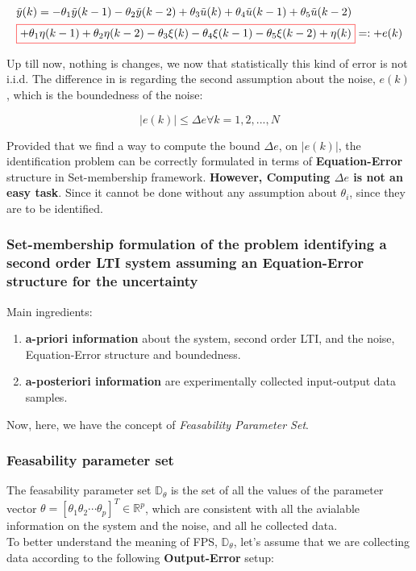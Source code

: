 \[
\begin{array}{l}
\tilde{y}(k)= -\theta_1 \tilde{y}(k - 1) - \theta_2 \tilde{y}(k - 2) + \theta_3 \tilde{u}(k) + \theta_4 \tilde{u}(k - 1) + \theta_5 \tilde{u}(k - 2) \\[1ex]
\textcolor{red}{\fbox{\textcolor{black}{$+ \theta_1\eta(k-1) + \theta_2\eta(k-2) - \theta_3\xi(k) - \theta_4\xi(k-1) - \theta_5\xi(k-2) + \eta(k) $}}} =: + e(k) \\
\end{array}
\]

Up till now, nothing is changes, we now that statistically this kind of error is not i.i.d. The difference in is regarding the second assumption about the noise, \(e(k)\), which is the boundedness of the noise:

\[\left| e(k)\right| \leq \Delta e \forall k = 1, 2, ..., N\]

Provided that we find a way to compute the bound \(\Delta e \), on \(\left| e(k)\right|\), the identification problem can be correctly formulated in terms of \textbf{Equation-Error} structure in Set-membership framework. \textbf{However, Computing \(\Delta e \) is not an easy task}. Since it cannot be done without any assumption about \(\theta_i\), since they are to be identified.

\subsubsection{Set-membership formulation of the problem identifying a second order LTI system assuming an Equation-Error structure for the uncertainty}
Main ingredients:
\begin{enumerate}
\item \textbf{a-priori information }about the system, second order LTI, and the noise, Equation-Error structure and boundedness.
\item\textbf{ a-posteriori information} are experimentally collected input-output data samples.
\end{enumerate}
Now, here, we have the concept of \textit{Feasability Parameter Set}.

\subsubsection{Feasability parameter set}
The feasability parameter set \(\mathbb{D}_\theta\) is the set of all the values of the parameter vector \(\theta = \left[ \theta_1 \theta_2 \cdots \theta_p \right]^T \in \mathbb{R}^p\), which are consistent with all the avialable information on the system and the noise, and all he collected data.\\
To better understand the meaning of FPS, \(\mathbb{D}_\theta\), let's assume that we are collecting data according to the following\textbf{ Output-Error} setup:\\

